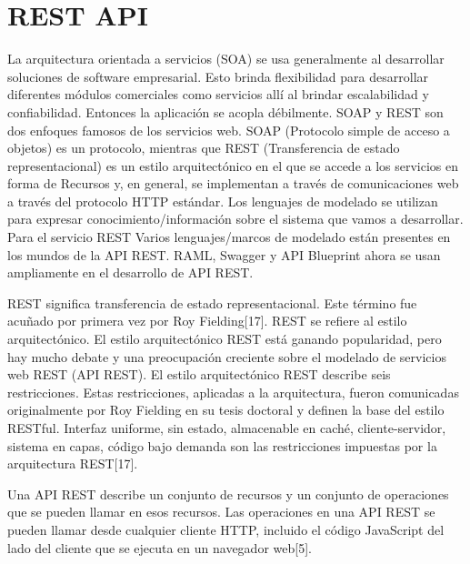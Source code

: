 \section{REST API}

La arquitectura orientada a servicios (SOA) se usa generalmente al desarrollar soluciones de software empresarial. Esto brinda flexibilidad para desarrollar diferentes módulos comerciales como servicios allí al brindar escalabilidad y confiabilidad. Entonces la aplicación se acopla débilmente. SOAP y REST son dos enfoques famosos de los servicios web. SOAP (Protocolo simple de acceso a objetos) es un protocolo, mientras que REST (Transferencia de estado representacional) es un estilo arquitectónico en el que se accede a los servicios en forma de Recursos y, en general, se implementan a través de comunicaciones web a través del protocolo HTTP estándar. Los lenguajes de modelado se utilizan para expresar conocimiento/información sobre el sistema que vamos a desarrollar. Para el servicio REST Varios lenguajes/marcos de modelado están presentes en los mundos de la API REST. RAML, Swagger y API Blueprint ahora se usan ampliamente en el desarrollo de API REST.

REST significa transferencia de estado representacional. Este término fue acuñado por primera vez por Roy Fielding[17]. REST se refiere al estilo arquitectónico. El estilo arquitectónico REST está ganando popularidad, pero hay mucho debate y una preocupación creciente sobre el modelado de servicios web REST (API REST). El estilo arquitectónico REST describe seis restricciones. Estas restricciones, aplicadas a la arquitectura, fueron comunicadas originalmente por Roy Fielding en su tesis doctoral y definen la base del estilo RESTful. Interfaz uniforme, sin estado, almacenable en caché, cliente-servidor, sistema en capas, código bajo demanda son las restricciones impuestas por la arquitectura REST[17].

Una API REST describe un conjunto de recursos y un conjunto de operaciones que se pueden llamar en esos recursos. Las operaciones en una API REST se pueden llamar desde cualquier cliente HTTP, incluido el código JavaScript del lado del cliente que se ejecuta en un navegador web[5].



